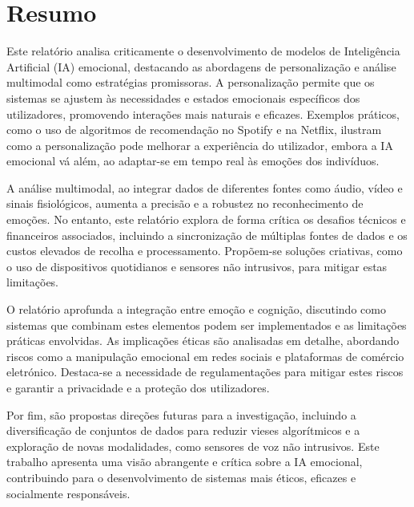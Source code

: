 \documentclass[a4paper,12pt]{report}
\begin{document}
	
	\newpage
	\thispagestyle{empty}
	\mbox{}
	\newpage
	
	
	\section*{Resumo}
	
	Este relatório analisa criticamente o desenvolvimento de modelos de Inteligência Artificial (IA) emocional, destacando as abordagens de personalização e análise multimodal como estratégias promissoras. A personalização permite que os sistemas se ajustem às necessidades e estados emocionais específicos dos utilizadores, promovendo interações mais naturais e eficazes. Exemplos práticos, como o uso de algoritmos de recomendação no Spotify e na Netflix, ilustram como a personalização pode melhorar a experiência do utilizador, embora a IA emocional vá além, ao adaptar-se em tempo real às emoções dos indivíduos.
	
	A análise multimodal, ao integrar dados de diferentes fontes como áudio, vídeo e sinais fisiológicos, aumenta a precisão e a robustez no reconhecimento de emoções. No entanto, este relatório explora de forma crítica os desafios técnicos e financeiros associados, incluindo a sincronização de múltiplas fontes de dados e os custos elevados de recolha e processamento. Propõem-se soluções criativas, como o uso de dispositivos quotidianos e sensores não intrusivos, para mitigar estas limitações.
	
	O relatório aprofunda a integração entre emoção e cognição, discutindo como sistemas que combinam estes elementos podem ser implementados e as limitações práticas envolvidas. As implicações éticas são analisadas em detalhe, abordando riscos como a manipulação emocional em redes sociais e plataformas de comércio eletrónico. Destaca-se a necessidade de regulamentações para mitigar estes riscos e garantir a privacidade e a proteção dos utilizadores.
	
	Por fim, são propostas direções futuras para a investigação, incluindo a diversificação de conjuntos de dados para reduzir vieses algorítmicos e a exploração de novas modalidades, como sensores de voz não intrusivos. Este trabalho apresenta uma visão abrangente e crítica sobre a IA emocional, contribuindo para o desenvolvimento de sistemas mais éticos, eficazes e socialmente responsáveis.
	
\end{document}
